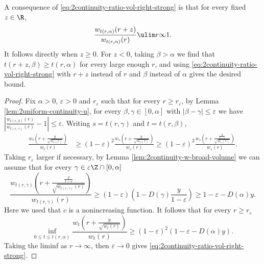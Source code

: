 \documentclass[10pt,a4paper]{article}
\begin{document}
A consequence of \eqref{eq:2continuity-ratio-vol-right-strong} is that for every fixed $z\in\R$, 
\begin{equation}\label{eq:2continuity-ratio-vol-constant-offset}
\frac{w_{t(r,\alpha)}(r+z)}{w_{t(r,\alpha)}(r)} \ulim r \infty 1 .
\end{equation}
It follows directly when $z\geq 0$. For $z<0$, taking $\beta>\alpha$ we find that $t(r+z,\beta) \geq t(r,\alpha)$ for every large enough $r$, and using \eqref{eq:2continuity-ratio-vol-right-strong} with $r+z$ instead of $r$ and $\beta$ instead of $\alpha$ gives the desired bound. 



\begin{proof}
Fix $\alpha>0$, 
$\varepsilon>0$ and $r_\varepsilon$ such that for every $r\geq r_\varepsilon$, by Lemma \ref{lem:2uniform-continuity-u}, for every $\beta,\gamma \in [0,\alpha]$ with $|\beta-\gamma|\leq \varepsilon$ we have $\left| \frac{w_{t(r,\beta)}(r)}{w_{t(r,\gamma)}(r)} - 1 \right| \leq \varepsilon$. Writing $s = t(r,\gamma)$ and $t=t(r,\beta)$, 
\begin{align*}
\frac{w_t\left(r+\frac{y}{\sqrt{w_t(r)}}\right)}{w_t(r)} 
&\geq (1-\varepsilon)^2 \frac{w_s\left( r + \frac{y}{\sqrt{w_t(r)}}\right)}{w_s(r)} 
\geq (1-\varepsilon)^2 \frac{w_s\left( r + \frac{\frac{y}{1-\varepsilon}}{\sqrt{w_s(r)}}\right)}{w_s(r)}  .
\end{align*}
Taking $r_\varepsilon$ larger if necessary, by Lemma \ref{lem:2continuity-w-broad-volume} we can assume that for every $\gamma \in \varepsilon\Z \cap [0,\alpha]$
\[ \frac{w_{t(r,\gamma)}\left( r + \frac{\frac{y}{1-\varepsilon}}{\sqrt{w_{t(r,\gamma)}(r)}}\right)}{w_{t(r,\gamma)}(r)} \geq (1-\varepsilon) \left(1 - D(\gamma) \frac{y}{1-\varepsilon} \right) \geq 1-\varepsilon - D(\alpha) y .
\]
Here we used that $c$ is a nonincreasing function. It follows that for every $r\geq r_\varepsilon$
\[ \inf_{0\leq t \leq t(r,\alpha)} \frac{w_t\left(r + \frac{y}{\sqrt{w_t(r)}}\right)}{w_t(r)}  \geq  (1-\varepsilon)^2 (1 - \varepsilon - D(\alpha) y) .\]
Taking the liminf as $r\to\infty$, then $\varepsilon\to 0$ gives \eqref{eq:2continuity-ratio-vol-right-strong}. 



\end{proof}
\end{document}
